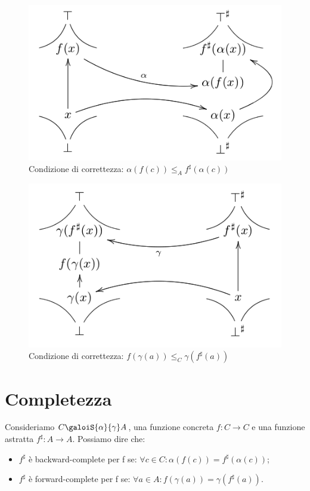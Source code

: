 \documentclass[a4paper, 10pt]{book}
\begin{document}
	\begin{multicols}{2}	
		\begin{figure}[H]
			\centering
			\includegraphics[scale=0.35]{pngs/Correttezza}
			\caption{Condizione di correttezza: $\alpha(f(c))\leq_A f^{\sharp}(\alpha(c))$}
			\label{Correct}
		\end{figure}
		\columnbreak
		\begin{figure}[H]
			\centering
			\includegraphics[scale=0.35]{pngs/CorrettezzaAstr}
			\caption{Condizione di correttezza: $f(\gamma(a))\leq_C \gamma(f^{\sharp}(a))$}
			\label{CorrectAbstr}
		\end{figure}
	\end{multicols}
	
	\section{Completezza}
	Consideriamo $C \galoiS{\alpha}{\gamma} A$, una funzione concreta $f: C\rightarrow C$ e una funzione astratta $f^{\sharp}: A\rightarrow A$. Possiamo dire che:
	\begin{itemize}
		\item $f^{\sharp}$ è backward-complete per f se: $\forall c\in C: \alpha(f(c))=f^{\sharp}(\alpha(c))$;
		\item $f^{\sharp}$ è forward-complete per f se: $\forall a\in A: f(\gamma(a))=\gamma(f^{\sharp}(a))$.
	\end{itemize}
	
\end{document}
